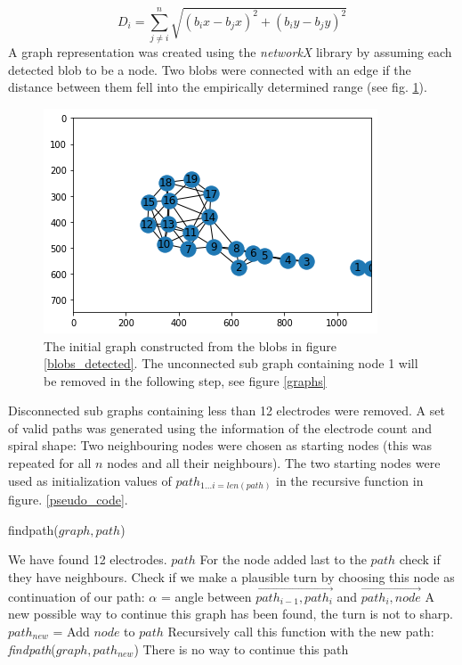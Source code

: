 \documentclass[a4paper, 10pt, twocolumn]{article}
\begin{document}
$$D_{i}=\sum_{j\neq i}^{n} \sqrt{(b_ix-b_jx)^2+(b_iy-b_jy)^2}$$
A graph representation was created using the \emph{networkX} library \cite{networkx} by assuming each detected blob to be a node. Two blobs were connected with an edge if the distance between them fell into the empirically determined range (see fig. \ref{network_raw}). %
\begin{figure}[ht]
	\centering
  \includegraphics[width=.5\textwidth]{network_raw.png}
	\caption{The initial graph constructed from the blobs in figure \ref{blobs_detected}. The unconnected sub graph containing node 1 will be removed in the following step, see figure \ref{graphs}}
	\label{network_raw}
\end{figure}
Disconnected sub graphs containing less than 12 electrodes were removed. A set of valid paths was generated using the information of the electrode count and spiral shape: Two neighbouring nodes were chosen as starting nodes (this was repeated for all $n$ nodes and all their neighbours). The two starting nodes were used as initialization values of $path_{1...i = len(path)}$ in the recursive function in figure. \ref{pseudo_code}.
\begin{algorithm*}
	\caption{findpath($graph,path$)} 
	
	\begin{algorithmic}[1]
			 \State We have found 12 electrodes.
		\Return $path$
		\EndIf
		\State For the node added last to the $path$ check if they have neighbours.
				\State Check if we make a plausible turn by choosing this node as continuation of our path:
				\State $\alpha$ = angle between $\overrightarrow{path_{i-1}, path_i}$ and $\overrightarrow{path_i, node}$
					\State A new possible way to continue this graph has been found, the turn is not to sharp.
					\State $path_{new}$ = Add $node$ to $path$
					\State Recursively call this function with the new path:
					\State \emph{findpath}($graph,path_{new}$)
				\EndIf
		\EndFor
			\State There is no way to continue this path
			\Return
		\EndIf
		
	\end{algorithmic} 
	\label{pseudo_code}
\end{algorithm*}
\end{document}
